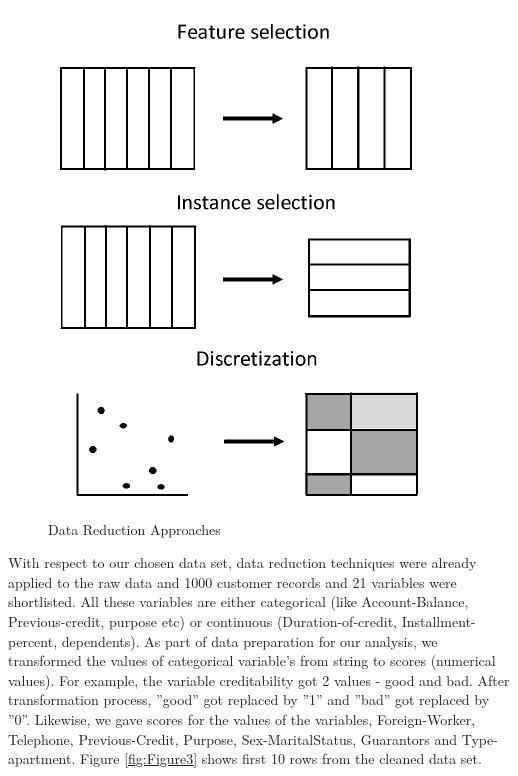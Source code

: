 \documentclass[sigconf]{acmart}
\begin{document}
\begin{figure}[htb]
  \centering
  \includegraphics[width=1.0\columnwidth]{project/images/Figure5.png}
  \caption{Data Reduction Approaches
  \cite{preprocessing}}
  \label{fig:Figure5} 
\end{figure}

With respect to our chosen data set, data reduction techniques were already applied to the raw data and 1000 customer records and 21 variables were shortlisted. All these variables are either categorical (like Account-Balance, Previous-credit, purpose etc) or continuous (Duration-of-credit, Installment-percent, dependents). As part of data preparation for our analysis, we transformed the values of categorical variable's from string to scores (numerical values). For example, the variable creditability got 2 values - good and bad. After transformation process, ''good'' got replaced by ''1'' and ''bad'' got replaced by ''0''. Likewise, we gave scores for the values of the variables, Foreign-Worker, Telephone, Previous-Credit, Purpose, Sex-MaritalStatus, Guarantors and Type-apartment. Figure \ref{fig:Figure3} shows first 10 rows from the cleaned data set. 
\end{document}
